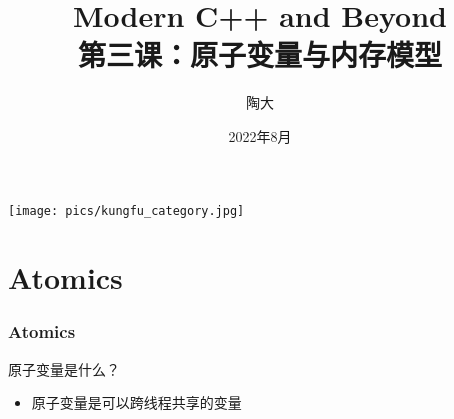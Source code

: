 \documentclass[UTF8,lualatex]{ctexbeamer}
\title{\kaishu Modern C++ and Beyond\\
    第三课：原子变量与内存模型}
\author{陶大}
\date{2022年8月}
\begin{document}
\songti

\begin{frame}[plain]
    \titlepage
\end{frame}

\begin{frame}[plain]
    \begin{center}
        \texttt{[image: pics/kungfu\_category.jpg]}
    \end{center}
\end{frame}

\begin{frame}[plain]
    \tableofcontents
\end{frame}

\section{Atomics}

\begin{frame}
    \frametitle{Atomics}
    \begin{block}{原子变量是什么？}
        \begin{itemize}
            \item 原子变量是可以跨线程共享的变量
        \end{itemize}
    \end{block}
\end{frame}

\end{document}
